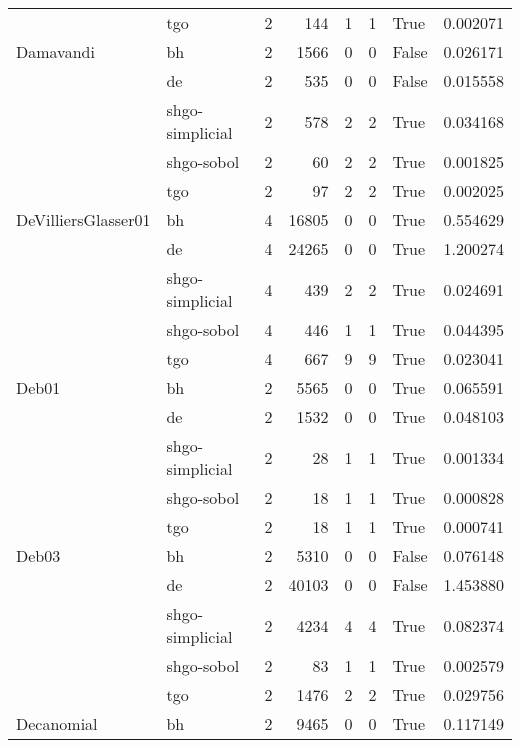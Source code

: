 \begin{longtable}{llrrrrlr}
         & tgo &     2 &      144 &      1 &       1 &    True &    0.002071 \\
Damavandi & bh &     2 &     1566 &      0 &       0 &   False &    0.026171 \\
         & de &     2 &      535 &      0 &       0 &   False &    0.015558 \\
         & shgo-simplicial &     2 &      578 &      2 &       2 &    True &    0.034168 \\
         & shgo-sobol &     2 &       60 &      2 &       2 &    True &    0.001825 \\
         & tgo &     2 &       97 &      2 &       2 &    True &    0.002025 \\
DeVilliersGlasser01 & bh &     4 &    16805 &      0 &       0 &    True &    0.554629 \\
         & de &     4 &    24265 &      0 &       0 &    True &    1.200274 \\
         & shgo-simplicial &     4 &      439 &      2 &       2 &    True &    0.024691 \\
         & shgo-sobol &     4 &      446 &      1 &       1 &    True &    0.044395 \\
         & tgo &     4 &      667 &      9 &       9 &    True &    0.023041 \\
Deb01 & bh &     2 &     5565 &      0 &       0 &    True &    0.065591 \\
         & de &     2 &     1532 &      0 &       0 &    True &    0.048103 \\
         & shgo-simplicial &     2 &       28 &      1 &       1 &    True &    0.001334 \\
         & shgo-sobol &     2 &       18 &      1 &       1 &    True &    0.000828 \\
         & tgo &     2 &       18 &      1 &       1 &    True &    0.000741 \\
Deb03 & bh &     2 &     5310 &      0 &       0 &   False &    0.076148 \\
         & de &     2 &    40103 &      0 &       0 &   False &    1.453880 \\
         & shgo-simplicial &     2 &     4234 &      4 &       4 &    True &    0.082374 \\
         & shgo-sobol &     2 &       83 &      1 &       1 &    True &    0.002579 \\
         & tgo &     2 &     1476 &      2 &       2 &    True &    0.029756 \\
Decanomial & bh &     2 &     9465 &      0 &       0 &    True &    0.117149 \\

\end{longtable}
